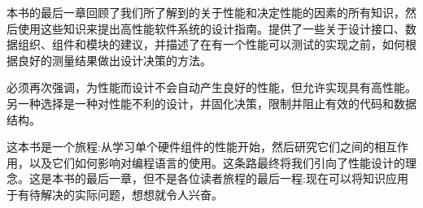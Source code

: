 本书的最后一章回顾了我们所了解到的关于性能和决定性能的因素的所有知识，然后使用这些知识来提出高性能软件系统的设计指南。提供了一些关于设计接口、数据组织、组件和模块的建议，并描述了在有一个性能可以测试的实现之前，如何根据良好的测量结果做出设计决策的方法。

必须再次强调，为性能而设计不会自动产生良好的性能，但允许实现具有高性能。另一种选择是一种对性能不利的设计，并固化决策，限制并阻止有效的代码和数据结构。

这本书是一个旅程:从学习单个硬件组件的性能开始，然后研究它们之间的相互作用，以及它们如何影响对编程语言的使用。这条路最终将我们引向了性能设计的理念。这是本书的最后一章，但不是各位读者旅程的最后一程:现在可以将知识应用于有待解决的实际问题，想想就令人兴奋。